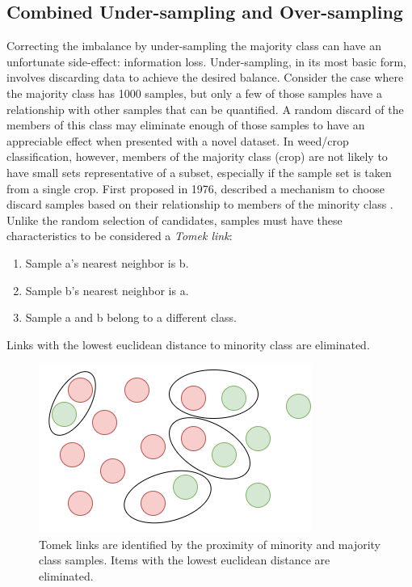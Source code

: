 \documentclass[letterpaper]{report}
\begin{document}
\subsection{Combined Under-sampling and Over-sampling}
\label{section:under}
Correcting the imbalance by under-sampling the majority class can have an unfortunate side-effect: information loss. Under-sampling, in its most basic form, involves discarding data to achieve the desired balance. Consider the case where the majority class has 1000 samples, but only a few of those samples have a relationship with other samples that can be quantified. A random discard of the members of this class may eliminate enough of those samples to have an appreciable effect when presented with a novel dataset. In weed/crop classification, however, members of the majority class (crop) are not likely to have small sets representative of a subset, especially if the sample set is taken from a single crop.
First proposed in 1976, \citeauthor{Tomek1976-bg} described a mechanism to choose discard samples based on their relationship to members of the minority class \parencite{Tomek1976-bg}. Unlike the random selection of candidates, samples must have these characteristics to be considered a \textit{Tomek link}:
\begin{enumerate}
\item{Sample a’s nearest neighbor is b.}
\item{Sample b’s nearest neighbor is a.}
\item{Sample a and b belong to a different class.}
\end{enumerate}
Links with the lowest euclidean distance to  minority class are eliminated.
\begin{figure}[H]
	\centering
	\includegraphics[scale=0.30]{./figures/tomek-a.png}
	\caption[Tomek links]{Tomek links are identified by the proximity of minority and majority class samples. Items with the lowest euclidean distance are eliminated.}
	\label{fig:tomek}
\end{figure}
\end{document}
